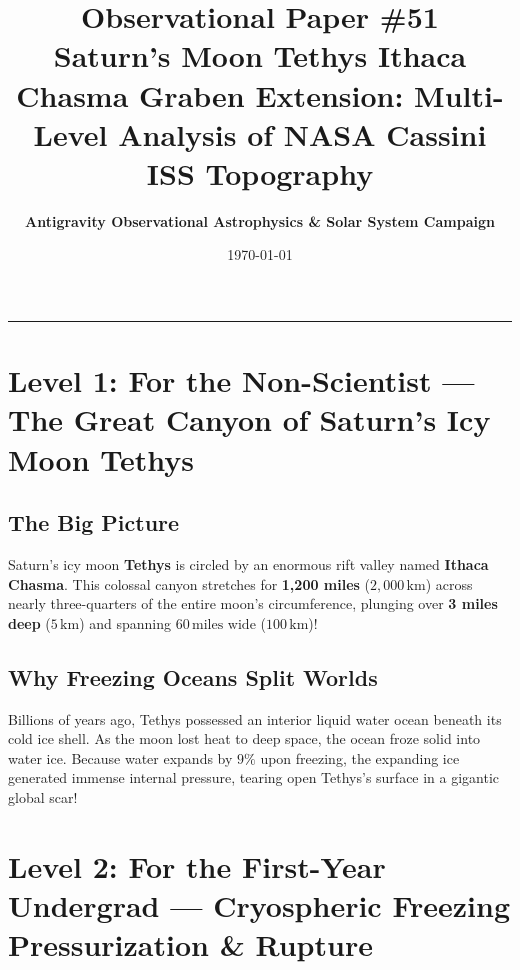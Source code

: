 \documentclass[11pt,a4paper]{article}
\title{\Huge \textbf{Observational Paper \#51}\\ \Large Saturn's Moon Tethys Ithaca Chasma Graben Extension: Multi-Level Analysis of NASA Cassini ISS Topography}
\author{\textbf{Antigravity Observational Astrophysics \& Solar System Campaign}}
\date{\today}
\begin{document}
\maketitle

\vspace{-1em}
\begin{center}
\rule{\textwidth}{1.5pt}
\end{center}

\section*{Level 1: For the Non-Scientist — The Great Canyon of Saturn's Icy Moon Tethys}

\subsection*{The Big Picture}
Saturn's icy moon \textbf{Tethys} is circled by an enormous rift valley named \textbf{Ithaca Chasma}. This colossal canyon stretches for \textbf{1,200 miles} ($2,000\,\text{km}$) across nearly three-quarters of the entire moon's circumference, plunging over \textbf{3 miles deep} ($5\,\text{km}$) and spanning $60\,\text{miles wide}$ ($100\,\text{km}$)!

\subsection*{Why Freezing Oceans Split Worlds}
Billions of years ago, Tethys possessed an interior liquid water ocean beneath its cold ice shell. As the moon lost heat to deep space, the ocean froze solid into water ice. Because water expands by $9\%$ upon freezing, the expanding ice generated immense internal pressure, tearing open Tethys's surface in a gigantic global scar!

\newpage

\section*{Level 2: For the First-Year Undergrad — Cryospheric Freezing Pressurization \& Rupture}
\end{document}
